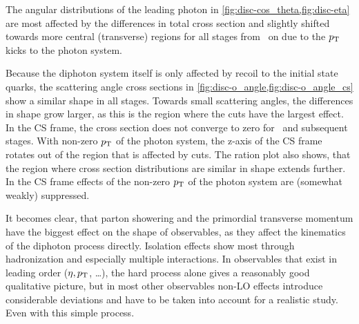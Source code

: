 The angular distributions of the leading photon in
\cref{fig:disc-cos_theta,fig:disc-eta} are most affected by the
differences in total cross section and slightly shifted towards more
central (transverse) regions for all stages from \sttwo\ on due to the
\(p_\mathrm{T}\) kicks to the photon system.

Because the diphoton system itself is only affected by recoil to the
initial state quarks, the scattering angle cross sections in
\cref{fig:disc-o_angle,fig:disc-o_angle_cs} show a similar shape in
all stages. Towards small scattering angles, the differences in shape
grow larger, as this is the region where the cuts have the largest
effect. In the CS frame, the cross section does not converge to zero
for \sttwo\ and subsequent stages. With non-zero \(p_\mathrm{T}\) of the photon
system, the z-axis of the CS frame rotates out of the region that is
affected by cuts. The ration plot also shows, that the region where
cross section distributions are similar in shape extends further. In
the CS frame effects of the non-zero \(p_\mathrm{T}\) of the photon system are
(somewhat weakly) suppressed.

It becomes clear, that parton showering and the primordial transverse
momentum have the biggest effect on the shape of observables, as they
affect the kinematics of the diphoton process directly. Isolation
effects show most through hadronization and especially multiple
interactions. In observables that exist in leading order
(\(\eta, p_\mathrm{T}\), \ldots), the hard process alone gives a reasonably
good qualitative picture, but in most other observables non-LO effects
introduce considerable deviations and have to be taken into account
for a realistic study. Even with this simple process.

